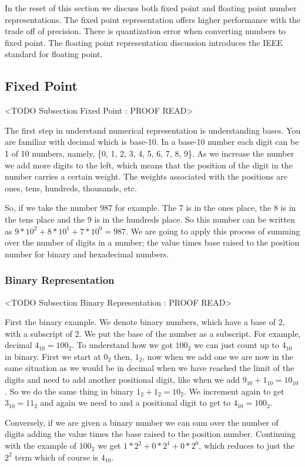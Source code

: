 In the reset of this section we discuss both fixed point and floating point number representations. The fixed point representation offers higher performance with the trade off of precision. There is quantization error when converting numbers to fixed point. The floating point representation discussion introduces the \ac{IEEE} standard for floating point.
	
\subsection{Fixed Point}
	<TODO Subsection Fixed Point : PROOF READ>

The first step in understand numerical representation is understanding bases. You are familiar with decimal which is base-10. In a base-10 number each digit can be 1 of 10 numbers, namely, \{0, 1, 2, 3, 4, 5, 6, 7, 8, 9\}. As we increase the number we add more digits to the left, which means that the position of the digit in the number carries a certain weight. The weights associated with the positions are ones, tens, hundreds, thousands, etc.

So, if we take the number 987 for example. The 7 is in the ones place, the 8 is in the tens place and the 9 is in the hundreds place. So this number can be written as $9*10^2 + 8*10^1 + 7*10^0 = 987$. We are going to apply this process of summing over the number of digits in a number; the value times base raised to the position number for binary and hexadecimal numbers. 

\subsubsection{Binary Representation}
	<TODO Subsection Binary Representation : PROOF READ>
	
First the binary example. We denote binary numbers, which have a base of 2, with a subscript of 2. We put the base of the number as a subscript. For example, decimal $4_{10} = {100}_2$. To understand how we got ${100}_2$ we can just count up to $4_{10}$ in binary. First we start at $0_{2}$ then, $1_2$, now when we add one we are now in the same situation as we would be in decimal when we have reached the limit of the digits and need to add another positional digit, like when we add $9_{10} + 1_{10} = 10_{10}$. So we do the same thing in binary $1_2 + 1_2 = 10_2$. We increment again to get $3_{10} = 11_2$ and again we need to and a positional digit to get to $4_{10} = 100_2$.

Conversely, if we are given a binary number we can sum over the number of digits adding the value times the base raised to the position number. Continuing with the example of $100_2$ we get $1*2^2 + 0*2^1 + 0*2^0$, which reduces to just the $2^2$ term which of course is $4_{10}$.
	
